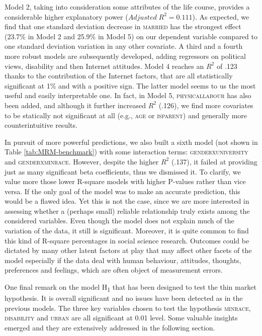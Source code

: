 Model 2, taking into consideration some attributes of the life course,
provides a considerable higher explanatory power ($Adjusted\;R^{2}=0.111$).
As expected, we find that one standard deviation decrease in \textsc{married}
has the strongest effect (23.7\% in Model 2 and 25.9\% in Model 5)
on our dependent variable compared to one standard deviation variation
in any other covariate. A third and a fourth more robust models are
subsequently developed, adding regressors on political views, disability
and then Internet attitudes. Model 4 reaches an $R^{2}$ of .123 thanks
to the contribution of the Internet factors, that are all statistically
significant at 1\% and with a positive sign. The latter model seems
to us the most useful and easily interpretable one. In fact, in Model
5, \textsc{physicallabour} has also been added, and although it further
increased $R^{2}$ (.126), we find more covariates to be statically
not significant at all (e.g., \textsc{age} or \textsc{isparent}) and
generally more counterintuitive results.

In pursuit of more powerful predictions, we also built a sixth model
(not shown in Table \ref{tab:MRM-benchmark}) with some interaction
terms: \textsc{genderxuniversity} and \textsc{genderxminrace}. However,
despite the higher $R^{2}$ (.137), it failed at providing just as
many significant beta coefficients, thus we dismissed it. To clarify,
we value more those lower R-square models with higher P-values rather
than vice versa. If the only goal of the model was to make an accurate
prediction, this would be a flawed idea. Yet this is not the case,
since we are more interested in assessing whether a (perhaps small)
reliable relationship truly exists among the considered variables.
Even though the model does not explain much of the variation of the
data, it still is significant. Moreover, it is quite common to find
this kind of R-square percentages in social science research. Outcomes
could be dictated by many other latent factors at play that may affect
other facets of the model \textendash{} especially if the data deal
with human behaviour, attitudes, thoughts, preferences and feelings,
which are often object of measurement errors.

One final remark on the model H\textsubscript{1} that has been designed
to test the thin market hypothesis. It is overall significant and
no issues have been detected as in the previous models. The three
key variables chosen to test the hypothesis \textendash{} \textsc{minrace},
\textsc{disability} and \textsc{urban} \textendash{} are all significant
at 0.01 level. Some valuable insights emerged and they are extensively
addressed in the following section.

